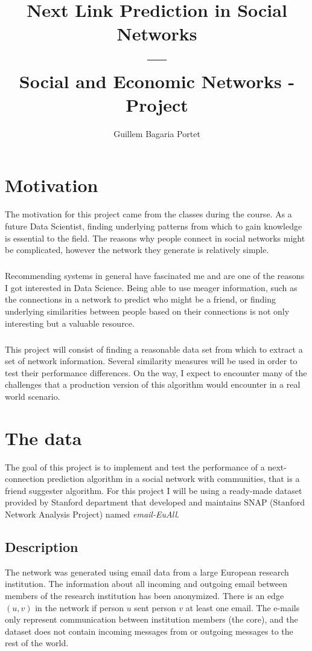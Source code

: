\documentclass[12pt,a4paper]{report}
\author{Guillem Bagaria Portet}
\title{Next Link Prediction in Social Networks \\
	--- \\
	\large Social and Economic Networks - Project \\}
\begin{document}
\maketitle
\tableofcontents
\chapter{Motivation} The motivation for this project came from the classes during the course. As a future Data Scientist, finding underlying patterns from which to gain knowledge is essential to the field. The reasons why people connect in social networks might be complicated, however the network they generate is relatively simple.

\paragraph{} Recommending systems in general have fascinated me and are one of the reasons I got interested in Data Science. Being able to use meager information, such as the connections in a network to predict who might be a friend, or finding underlying similarities between people based on their connections is not only interesting but a valuable resource.

\paragraph{} This project will consist of finding a reasonable data set from which to extract a set of network information. Several similarity measures will be used in order to test their performance differences. On the way, I expect to encounter many of the challenges that a production version of this algorithm would encounter in a real world scenario.

\chapter{The data} The goal of this project is to implement and test the performance of a next-connection prediction algorithm in a social network with communities, that is a friend suggester algorithm. For this project I will be using a ready-made dataset provided by Stanford department that developed and maintains SNAP (Stanford Network Analysis Project) named \emph{email-EuAll}.

\section{Description} The network was generated using email data from a large European research institution. The information about all incoming and outgoing email between members of the research institution has been anonymized. There is an edge $(u, v)$ in the network if person $u$ sent person $v$ at least one email. The e-mails only represent communication between institution members (the core), and the dataset does not contain incoming messages from or outgoing messages to the rest of the world.
\end{document}
